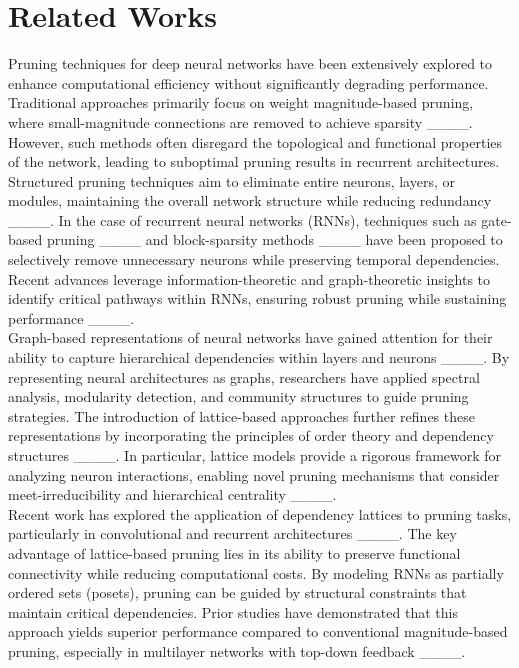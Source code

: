 \section{Related Works}
Pruning techniques for deep neural networks have been extensively explored to enhance computational efficiency without significantly degrading performance. Traditional approaches primarily focus on weight magnitude-based pruning, where small-magnitude connections are removed to achieve sparsity ____. However, such methods often disregard the topological and functional properties of the network, leading to suboptimal pruning results in recurrent architectures.\\

Structured pruning techniques aim to eliminate entire neurons, layers, or modules, maintaining the overall network structure while reducing redundancy ____. In the case of recurrent neural networks (RNNs), techniques such as gate-based pruning ____ and block-sparsity methods ____ have been proposed to selectively remove unnecessary neurons while preserving temporal dependencies. Recent advances leverage information-theoretic and graph-theoretic insights to identify critical pathways within RNNs, ensuring robust pruning while sustaining performance ____.\\

Graph-based representations of neural networks have gained attention for their ability to capture hierarchical dependencies within layers and neurons ____. By representing neural architectures as graphs, researchers have applied spectral analysis, modularity detection, and community structures to guide pruning strategies. The introduction of lattice-based approaches further refines these representations by incorporating the principles of order theory and dependency structures ____. In particular, lattice models provide a rigorous framework for analyzing neuron interactions, enabling novel pruning mechanisms that consider meet-irreducibility and hierarchical centrality ____.\\

Recent work has explored the application of dependency lattices to pruning tasks, particularly in convolutional and recurrent architectures ____. The key advantage of lattice-based pruning lies in its ability to preserve functional connectivity while reducing computational costs. By modeling RNNs as partially ordered sets (posets), pruning can be guided by structural constraints that maintain critical dependencies. Prior studies have demonstrated that this approach yields superior performance compared to conventional magnitude-based pruning, especially in multilayer networks with top-down feedback ____.\\